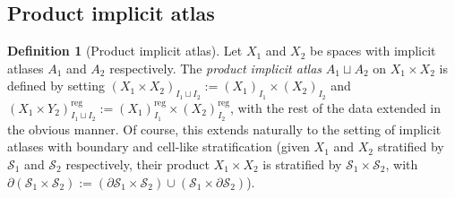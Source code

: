 \documentclass[12pt]{article}
\theoremstyle{definition}
\newtheorem{definition}[theorem]{Definition}
\theoremstyle{remark}
\numberwithin{equation}{subsection}
\newcommand{\SSS}{\mathcal S}
\newcommand{\reg}{\mathrm{reg}}
\begin{document}
\subsection{Product implicit atlas}\label{productatlasdef}

\begin{definition}[Product implicit atlas]\label{productimplicitatlas}
Let $X_1$ and $X_2$ be spaces with implicit atlases $A_1$ and $A_2$ respectively.  The \emph{product implicit atlas} $A_1\sqcup A_2$ on $X_1\times X_2$ is defined by setting $(X_1\times X_2)_{I_1\sqcup I_2}:=(X_1)_{I_1}\times(X_2)_{I_2}$ and $(X_1\times Y_2)^\reg_{I_1\sqcup I_2}:=(X_1)_{I_1}^\reg\times(X_2)_{I_2}^\reg$, with the rest of the data extended in the obvious manner.  Of course, this extends naturally to the setting of implicit atlases with boundary and cell-like stratification (given $X_1$ and $X_2$ stratified by $\SSS_1$ and $\SSS_2$ respectively, their product $X_1\times X_2$ is stratified by $\SSS_1\times\SSS_2$, with $\partial(\SSS_1\times\SSS_2):=(\partial\SSS_1\times\SSS_2)\cup(\SSS_1\times\partial\SSS_2)$).
\end{definition}
\end{document}
